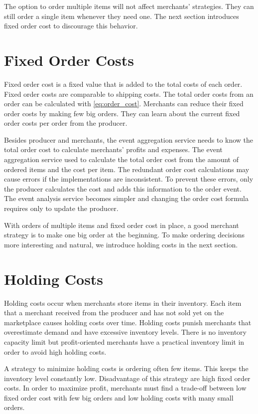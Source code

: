 The option to order multiple items will not affect merchants' strategies.
They can still order a single item whenever they need one.
The next section introduces fixed order cost to discourage this behavior.

\section{Fixed Order Costs}
\label{section:fixed_order_cost}
Fixed order cost is a fixed value that is added to the total costs of each order.
Fixed order costs are comparable to shipping costs.
The total order costs from an order can be calculated with \cref{eq:order_cost}.
Merchants can reduce their fixed order costs by making few big orders.
They can learn about the current fixed order costs per order from the producer.

Besides producer and merchants, the event aggregation service needs to know the total order cost to calculate merchants' profits and expenses.
The event aggregation service used to calculate the total order cost from the amount of ordered items and the cost per item.
The redundant order cost calculations may cause errors if the implementations are inconsistent.
To prevent these errors, only the producer calculates the cost and adds this information to the order event.
The event analysis service becomes simpler and changing the order cost formula requires only to update the producer.

With orders of multiple items and fixed order cost in place, a good merchant strategy is to make one big order at the beginning.
To make ordering decisions more interesting and natural, we introduce holding costs in the next section.

\section{Holding Costs}
\label{section:holding_cost}
Holding costs occur when merchants store items in their inventory.
Each item that a merchant received from the producer and has not sold yet on the marketplace causes holding costs over time.
Holding costs punish merchants that overestimate demand and have excessive inventory levels.
There is no inventory capacity limit but profit-oriented merchants have a practical inventory limit in order to avoid high holding costs.

A strategy to minimize holding costs is ordering often few items.
This keeps the inventory level constantly low.
Disadvantage of this strategy are high fixed order costs.
In order to maximize profit, merchants must find a trade-off between low fixed order cost with few big orders and low holding costs with many small orders.

